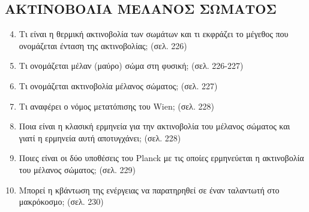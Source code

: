 \documentclass{article}
\begin{document}
\subsection{ΑΚΤΙΝΟΒΟΛΙΑ ΜΕΛΑΝΟΣ ΣΩΜΑΤΟΣ}
\begin{enumerate}
      \setcounter{enumi}{3}
      \item Τι είναι η θερμική ακτινοβολία των σωμάτων και τι εκφράζει το μέγεθος που ονομάζεται ένταση της ακτινοβολίας; (σελ. 226)

      \item Τι ονομάζεται μέλαν (μαύρο) σώμα στη φυσική; (σελ. 226-227)

      \item Τι ονομάζεται ακτινοβολία μέλανος σώματος; (σελ. 227)

      \item Τι αναφέρει ο νόμος μετατόπισης του Wien; (σελ. 228)

      \item Ποια είναι η κλασική ερμηνεία για την ακτινοβολία του μέλανος σώματος και γιατί η ερμηνεία αυτή αποτυγχάνει; (σελ. 228)

      \item Ποιες είναι οι δύο υποθέσεις του Planck με τις οποίες ερμηνεύεται η ακτινοβολία του μέλανος σώματος; (σελ. 229)

      \item Μπορεί η κβάντωση της ενέργειας να παρατηρηθεί σε έναν ταλαντωτή στο μακρόκοσμο; (σελ. 230)
\end{enumerate}
\end{document}
